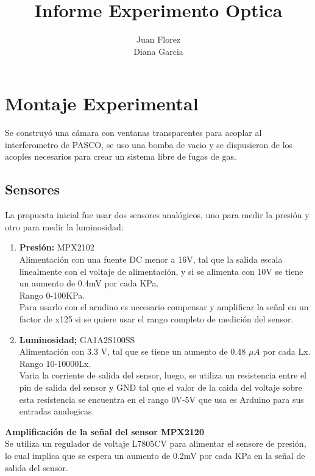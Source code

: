 \documentclass[11pt]{article}
\title{\textbf{Informe Experimento Optica}}
\author{Juan Florez\\
		Diana Garcia}
\date{}
\begin{document}
\maketitle

\section{Montaje Experimental}


Se construy\'o una c\'amara con ventanas transparentes para acoplar al interferometro de PASCO, se uso una bomba de vacio y se dispusieron de los acoples necesarios para crear un sistema libre de fugas de gas.\\

\subsection{Sensores}

La propuesta inicial fue usar dos sensores anal\'ogicos, uno para medir la presi\'on y otro para medir la luminosidad:

\begin{enumerate}
\item \textbf{Presi\'on:} MPX2102\\
Alimentaci\'on con una fuente DC menor a 16V, tal que la salida escala linealmente con el voltaje de alimentaci\'on, y si se alimenta con 10V se tiene un aumento de 0.4mV por cada KPa.\\
Rango 0-100KPa.\\
Para usarlo con el arudino es necesario compensar y amplificar la señal en un factor de x125 si se quiere usar el rango completo de medici\'on del sensor.
\item \textbf{Luminosidad;} GA1A2S100SS\\
Alimentaci\'on con 3.3 V, tal que se tiene un aumento de 0.48 $\mu A$ por cada Lx.\\
Rango 10-10000Lx.\\ 
Varia la corriente de salida del sensor, luego, se utiliza un resistencia entre el pin de salida del sensor y GND tal que el valor de la caida del voltaje sobre esta resistencia se encuentra en el rango 0V-5V que usa es Arduino para sus entradas analogicas. 
\end{enumerate}

\textbf{Amplificaci\'on de la señal del sensor MPX2120}\\

\noindent Se utiliza un regulador de voltaje L7805CV para alimentar el sensore de presi\'on, lo cual implica que se espera un aumento de 0.2mV por cada KPa en la señal de salida del sensor.\\
\end{document}
